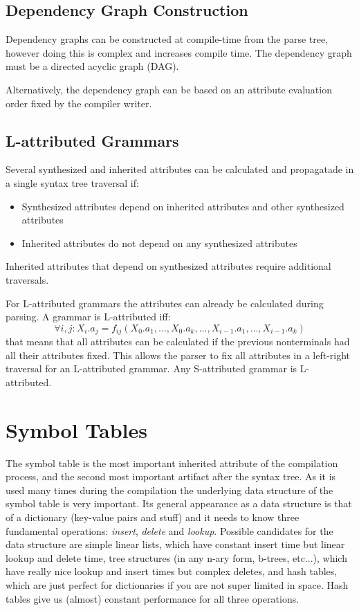 \documentclass{article}
\begin{document}
\subsection{Dependency Graph Construction}
Dependency graphs can be constructed at compile-time from the parse tree, however doing this is complex and increases compile time.
The dependency graph must be a directed acyclic graph (DAG).

Alternatively, the dependency graph can be based on an attribute evaluation order fixed by the compiler writer.

\subsection{L-attributed Grammars}
Several synthesized and inherited attributes can be calculated and propagatade in a single syntax tree traversal if:
\begin{itemize}
	\item Synthesized attributes depend on inherited attributes and other synthesized attributes
	\item Inherited attributes do not depend on any synthesized attributes
\end{itemize}
Inherited attributes that depend on synthesized attributes require additional traversals.

For L-attributed grammars the attributes can already be calculated during parsing.
A grammar is L-attributed iff:
\begin{equation}
	\forall i,j: X_i.a_j = f_{ij}(X_0.a_1, \dots, X_0.a_k, \dots, X_{i-1}.a_1, \dots, X_{i-1}.a_k)
\end{equation}
that means that all attributes can be calculated if the previous nonterminals had all their attributes fixed.
This allows the parser to fix all attributes in a left-right traversal for an L-attributed grammar.
Any S-attributed grammar is L-attributed.

\section{Symbol Tables}
The symbol table is the most important inherited attribute of the compilation process, and the second most important artifact after the syntax tree.
As it is used many times during the compilation the underlying data structure of the symbol table is very important.
Its general appearance as a data structure is that of a dictionary (key-value pairs and stuff) and it needs to know three fundamental operations: \emph{insert}, \emph{delete} and \emph{lookup}.
Possible candidates for the data structure are simple linear lists, which have constant insert time but linear lookup and delete time, tree structures (in any n-ary form, b-trees, etc...), which have really nice lookup and insert times but complex deletes, and hash tables, which are just perfect for dictionaries if you are not super limited in space.
Hash tables give us (almost) constant performance for all three operations.
\end{document}
